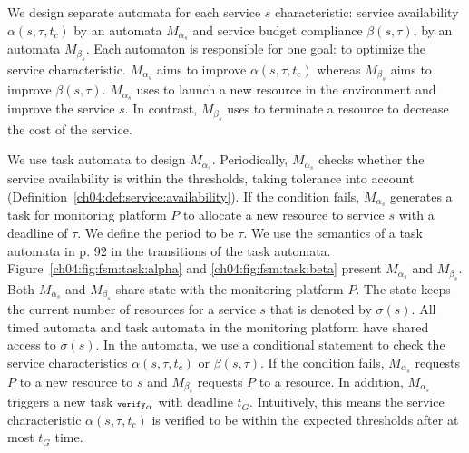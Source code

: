 We design separate automata for each service $s$ characteristic: service availability $\alpha(s,\tau,t_c)$ by an automata $M_{\alpha_s}$ and service budget compliance $\beta(s,\tau)$, by an automata $M_{\beta_s}$.
Each automaton is responsible for one goal: to optimize the service characteristic.
$M_{\alpha_s}$ aims to improve $\alpha(s,\tau,t_c)$ whereas $M_{\beta_s}$ aims to improve $\beta(s,\tau)$.
$M_{\alpha_s}$ uses  to launch a new resource in the environment and improve the service $s$.
In contrast, $M_{\beta_s}$ uses  to terminate a resource to decrease the cost of the service.

We use task automata to design $M_{\alpha_s}$.
Periodically, $M_{\alpha_s}$ checks whether the service availability
is within the thresholds, taking tolerance into account
(Definition~\ref{ch04:def:service:availability}).
If the condition fails, $M_{\alpha_s}$ generates a task for monitoring platform $P$ to allocate a new resource to service $s$ with a deadline of $\tau$.
We define the period to be $\tau$.
We use the semantics of a task automata in \cite{jaghoori2010time} p. 92 in the transitions of the task automata.
Figure~\ref{ch04:fig:fsm:task:alpha} and \ref{ch04:fig:fsm:task:beta} present $M_{\alpha_s}$ and $M_{\beta_s}$.
Both $M_{\alpha_s}$ and $M_{\beta_s}$ share state with the monitoring platform $P$.
The state keeps the current number of resources for a service $s$ that is denoted by $\sigma(s)$.
All timed automata and task automata in the monitoring platform have shared access to $\sigma(s)$.
In the automata, we use a conditional statement to check the service characteristics $\alpha(s,\tau,t_c)$ or $\beta(s,\tau)$.
If the condition fails, $M_{\alpha_s}$ requests $P$ to  a new resource to $s$ and $M_{\beta_s}$ requests $P$ to  a resource.
In addition, $M_{\alpha_s}$ triggers a new task ${\scriptsize\texttt{verify}}_\alpha$ with deadline $t_G$.
Intuitively, this means the service characteristic $\alpha(s,\tau,t_c)$ is verified to be within the expected thresholds after at most $t_G$ time.
